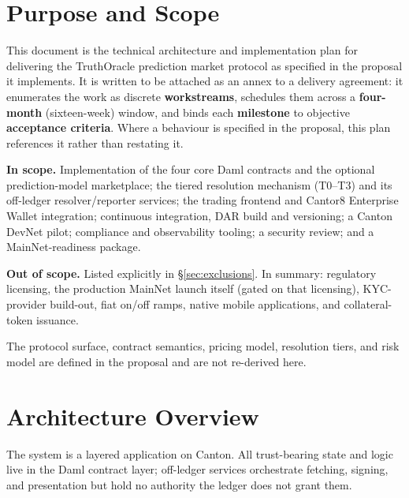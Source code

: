 \documentclass[11pt,a4paper]{article}
\begin{document}
\section{Purpose and Scope}

This document is the technical architecture and implementation plan for delivering the TruthOracle prediction market protocol as specified in the proposal it implements. It is written to be attached as an annex to a delivery agreement: it enumerates the work as discrete \textbf{workstreams}, schedules them across a \textbf{four-month} (sixteen-week) window, and binds each \textbf{milestone} to objective \textbf{acceptance criteria}. Where a behaviour is specified in the proposal, this plan references it rather than restating it.

\textbf{In scope.} Implementation of the four core Daml contracts and the optional prediction-model marketplace; the tiered resolution mechanism (T0--T3) and its off-ledger resolver/reporter services; the trading frontend and Cantor8 Enterprise Wallet integration; continuous integration, DAR build and versioning; a Canton DevNet pilot; compliance and observability tooling; a security review; and a MainNet-readiness package.

\textbf{Out of scope.} Listed explicitly in \S\ref{sec:exclusions}. In summary: regulatory licensing, the production MainNet launch itself (gated on that licensing), KYC-provider build-out, fiat on/off ramps, native mobile applications, and collateral-token issuance.

The protocol surface, contract semantics, pricing model, resolution tiers, and risk model are defined in the proposal and are not re-derived here.

\section{Architecture Overview}

The system is a layered application on Canton. All trust-bearing state and logic live in the Daml contract layer; off-ledger services orchestrate fetching, signing, and presentation but hold no authority the ledger does not grant them.
\end{document}
